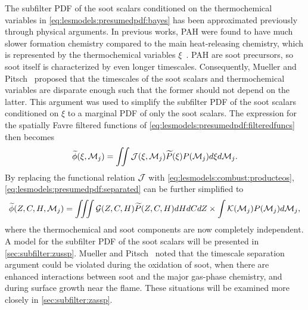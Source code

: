 The subfilter PDF of the soot scalars conditioned on the thermochemical variables in \cref{eq:lesmodels:presumedpdf:bayes} has been approximated previously through physical arguments. In previous works, PAH were found to have much slower formation chemistry compared to the main heat-releasing chemistry, which is represented by the thermochemical variables $\xi$~\cite{cuoci2009,attili2014,bisetti2012}. PAH are soot precursors, so soot itself is characterized by even longer timescales. Consequently, Mueller and Pitsch~\cite{subfilterpdf2011} proposed that the timescales of the soot scalars and thermochemical variables are disparate enough such that the former should not depend on the latter. This argument was used to simplify the subfilter PDF of the soot scalars conditioned on $\xi$ to a marginal PDF of only the soot scalars. The expression for the spatially Favre filtered functions of \cref{eq:lesmodels:presumedpdf:filteredfuncs} then becomes
\begin{equation}\label{eq:lesmodels:presumedpdf:separated}
  \widetilde{\phi}(\xi,\mathcal{M}_j) = \iint \mathcal{J}(\xi,\mathcal{M}_j)\widetilde{P}(\xi)P(\mathcal{M}_j) d\xi d\mathcal{M}_j.
\end{equation}
By replacing the functional relation $\mathcal{J}$ with \cref{eq:lesmodels:combust:producteos}, \cref{eq:lesmodels:presumedpdf:separated} can be further simplified to
\begin{equation}\label{eq:lesmodels:presumedpdf:indep}
  \widetilde{\phi}(Z,C,H,\mathcal{M}_j) = \iiint \mathcal{G}(Z,C,H)\widetilde{P}(Z,C,H) dHdCdZ \times \int \mathcal{K}(\mathcal{M}_j)P(\mathcal{M}_j) d\mathcal{M}_j,
\end{equation}
where the thermochemical and soot components are now completely independent. A model for the subfilter PDF of the soot scalars will be presented in \cref{sec:subfilter:zussp}. Mueller and Pitsch~\cite{subfilterpdf2011} noted that the timescale separation argument could be violated during the oxidation of soot, when there are enhanced interactions between soot and the major gas-phase chemistry, and during surface growth near the flame. These situations will be examined more closely in \cref{sec:subfilter:zassp}.

